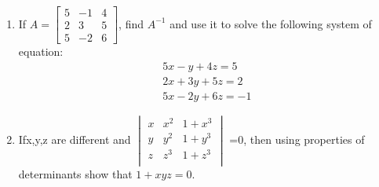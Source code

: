 \documentclass[12pt,-letter paper]{article}
\begin{document}
\begin{enumerate}
	\item If \(A= \begin{bmatrix} 5 & -1 & 4\\ 2 & 3 & 5\\  5 & -2 & 6 \end{bmatrix}\), find $A^{-1}$ and use it to solve the following system of 
		\\equation: \\
		\begin{align}
			5x-y+4z=5\\
			2x+3y+5z=2\\
			5x-2y+6z=-1
		\end{align}
	\item Ifx,y,z are different and $\begin{vmatrix} x & x^{2} & 1+x^{3}\\

			y & y^{2} & 1+y^{3}\\
			z & z^{3} & 1+z^{3}\\
	\end{vmatrix}$
			=$0$, then using properties of determinants show that $1+xyz=0$.



\end{enumerate}
\end{document}
